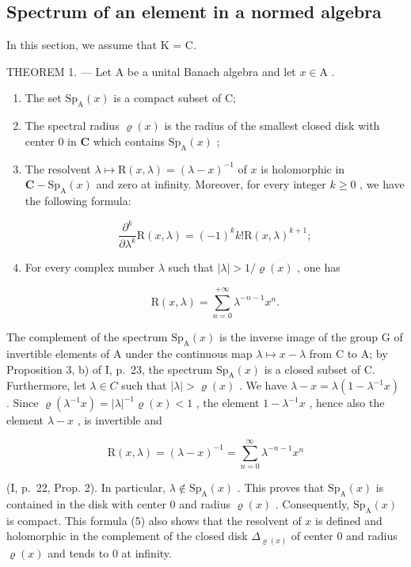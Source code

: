 \subsection{Spectrum of an element in a normed algebra}

In this section, we assume that K = C.

THEOREM 1. --- Let A be a unital Banach algebra and let \(x \in \mathrm{A}\) .

\begin{enumerate}
\def\labelenumi{\alph{enumi})}
\item
  The set \(\mathrm{Sp}_{\mathrm{A}}(x)\) is a compact subset of C;
\item
  The spectral radius \(\varrho(x)\) is the radius of the smallest closed disk with center 0 in \(\mathbf{C}\) which contains \(\mathrm{Sp}_{\mathrm{A}}(x)\) ;
\item
  The resolvent \(\lambda \mapsto \mathrm{R}(x,\lambda) = (\lambda -x)^{-1}\) of \(x\) is holomorphic in \(\mathbf{C} - \mathrm{Sp}_{\mathrm{A}}(x)\) and zero at infinity. Moreover, for every integer \(k\geqslant 0\) , we have the
following formula:

\[
\frac {\partial^ {k}}{\partial \lambda^ {k}} \mathrm{R} (x, \lambda) = (- 1) ^ {k} k! \mathrm{R} (x, \lambda) ^ {k + 1};
\]

\item
  For every complex number \(\lambda\) such that \(|\lambda| > 1 / \varrho(x)\) , one has

\[
\mathrm{R} (x, \lambda) = \sum_ {n = 0} ^ {+ \infty} \lambda^ {- n - 1} x ^ {n}.
\]

\end{enumerate}

The complement of the spectrum \(\mathrm{Sp}_{\mathrm{A}}(x)\) is the inverse image of the group G of invertible elements of A under the continuous map \(\lambda \mapsto x - \lambda\) from C to A; by Proposition 3, b) of I, p.~23, the spectrum \(\mathrm{Sp}_{\mathrm{A}}(x)\) is a closed subset of C. Furthermore, let \(\lambda \in C\) such that \(|\lambda| > \varrho(x)\) . We have \(\lambda - x = \lambda(1 - \lambda^{-1}x)\) . Since \(\varrho(\lambda^{-1}x) = |\lambda|^{-1}\varrho(x) < 1\) , the element \(1 - \lambda^{-1}x\) , hence also the element \(\lambda - x\) , is invertible and

\[
\mathrm{R} (x, \lambda) = (\lambda - x) ^ {- 1} = \sum_ {n = 0} ^ {\infty} \lambda^ {- n - 1} x ^ {n}\tag{5}
\]

(I, p.~22, Prop. 2). In particular, \(\lambda \notin \mathrm{Sp}_{\mathrm{A}}(x)\) . This proves that \(\mathrm{Sp}_{\mathrm{A}}(x)\) is contained in the disk with center 0 and radius \(\varrho(x)\) . Consequently, \(\mathrm{Sp}_{\mathrm{A}}(x)\) is compact. This formula (5) also shows that the resolvent of \(x\) is defined and holomorphic in the complement of the closed disk \(\Delta_{\varrho(x)}\) of center 0 and radius \(\varrho(x)\) and tends to 0 at infinity.

